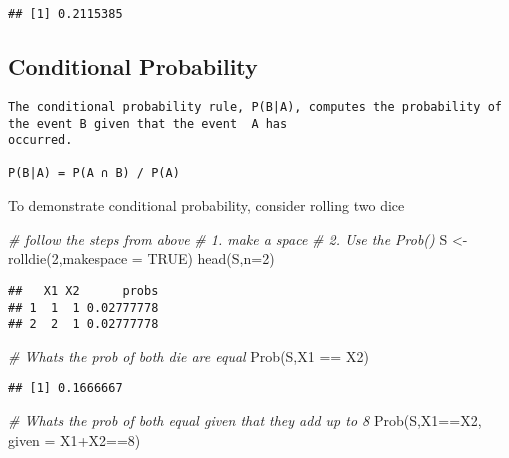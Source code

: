 \documentclass[
]{article}
\newenvironment{Shaded}{\begin{snugshade}}{\end{snugshade}}
\newcommand{\AttributeTok}[1]{\textcolor[rgb]{0.77,0.63,0.00}{#1}}
\newcommand{\CommentTok}[1]{\textcolor[rgb]{0.56,0.35,0.01}{\textit{#1}}}
\newcommand{\ConstantTok}[1]{\textcolor[rgb]{0.00,0.00,0.00}{#1}}
\newcommand{\DecValTok}[1]{\textcolor[rgb]{0.00,0.00,0.81}{#1}}
\newcommand{\FunctionTok}[1]{\textcolor[rgb]{0.00,0.00,0.00}{#1}}
\newcommand{\NormalTok}[1]{#1}
\newcommand{\OtherTok}[1]{\textcolor[rgb]{0.56,0.35,0.01}{#1}}
\newcommand{\SpecialCharTok}[1]{\textcolor[rgb]{0.00,0.00,0.00}{#1}}
\begin{document}
\begin{verbatim}
## [1] 0.2115385
\end{verbatim}

\hypertarget{conditional-probability}{%
\subsection{Conditional Probability}\label{conditional-probability}}

\begin{verbatim}
The conditional probability rule, P(B|A), computes the probability of the event B given that the event  A has
occurred.

P(B|A) = P(A ∩ B) / P(A)
\end{verbatim}

To demonstrate conditional probability, consider rolling two dice

\begin{Shaded}
\begin{Highlighting}[]
\CommentTok{\# follow the steps from above}
\CommentTok{\# 1. make a space}
\CommentTok{\# 2. Use the Prob() }
\NormalTok{S }\OtherTok{\textless{}{-}} \FunctionTok{rolldie}\NormalTok{(}\DecValTok{2}\NormalTok{,}\AttributeTok{makespace =} \ConstantTok{TRUE}\NormalTok{)}
\FunctionTok{head}\NormalTok{(S,}\AttributeTok{n=}\DecValTok{2}\NormalTok{)}
\end{Highlighting}
\end{Shaded}

\begin{verbatim}
##   X1 X2      probs
## 1  1  1 0.02777778
## 2  2  1 0.02777778
\end{verbatim}

\begin{Shaded}
\begin{Highlighting}[]
\CommentTok{\# Whats the prob of both die are equal}
\FunctionTok{Prob}\NormalTok{(S,X1 }\SpecialCharTok{==}\NormalTok{ X2)}
\end{Highlighting}
\end{Shaded}

\begin{verbatim}
## [1] 0.1666667
\end{verbatim}

\begin{Shaded}
\begin{Highlighting}[]
\CommentTok{\# Whats the prob of both equal given that they add up to 8}
\FunctionTok{Prob}\NormalTok{(S,X1}\SpecialCharTok{==}\NormalTok{X2, }\AttributeTok{given =}\NormalTok{ X1}\SpecialCharTok{+}\NormalTok{X2}\SpecialCharTok{==}\DecValTok{8}\NormalTok{)}
\end{Highlighting}
\end{Shaded}
\end{document}

